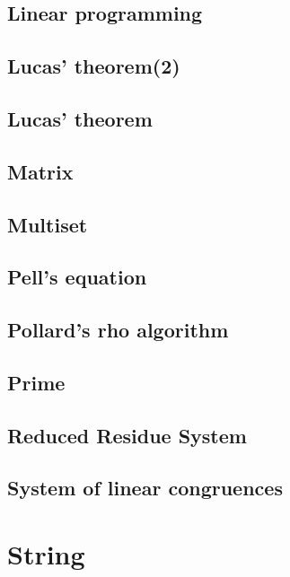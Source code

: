 \documentclass[a4paper,5pt,twocolumn,titlepage]{article}
\begin{document}
\subsection{Linear programming}

\subsection{Lucas' theorem(2)}

\subsection{Lucas' theorem}

\subsection{Matrix}

\subsection{Multiset}

\subsection{Pell's equation}

\subsection{Pollard's rho algorithm}

\subsection{Prime}

\subsection{Reduced Residue System}

\subsection{System of linear congruences}


\section{String}
\end{document}

